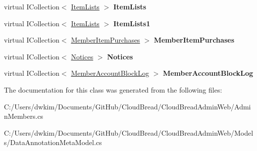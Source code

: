 \begin{DoxyCompactItemize}
\item 
virtual I\+Collection$<$ \hyperlink{class_cloud_bread_admin_web_1_1_item_lists}{Item\+Lists} $>$ {\bfseries Item\+Lists}\hypertarget{class_cloud_bread_admin_web_1_1_admin_members_a381363569bddc3b70eb317ced069f2b6}{}\label{class_cloud_bread_admin_web_1_1_admin_members_a381363569bddc3b70eb317ced069f2b6}

\item 
virtual I\+Collection$<$ \hyperlink{class_cloud_bread_admin_web_1_1_item_lists}{Item\+Lists} $>$ {\bfseries Item\+Lists1}\hypertarget{class_cloud_bread_admin_web_1_1_admin_members_ab9966913bf9066af36854b89bb31559f}{}\label{class_cloud_bread_admin_web_1_1_admin_members_ab9966913bf9066af36854b89bb31559f}

\item 
virtual I\+Collection$<$ \hyperlink{class_cloud_bread_admin_web_1_1_member_item_purchases}{Member\+Item\+Purchases} $>$ {\bfseries Member\+Item\+Purchases}\hypertarget{class_cloud_bread_admin_web_1_1_admin_members_a20dd33b5b3af8ddb5ace97df907e731d}{}\label{class_cloud_bread_admin_web_1_1_admin_members_a20dd33b5b3af8ddb5ace97df907e731d}

\item 
virtual I\+Collection$<$ \hyperlink{class_cloud_bread_admin_web_1_1_notices}{Notices} $>$ {\bfseries Notices}\hypertarget{class_cloud_bread_admin_web_1_1_admin_members_a8dee785902766e4727902f0fb2fb3729}{}\label{class_cloud_bread_admin_web_1_1_admin_members_a8dee785902766e4727902f0fb2fb3729}

\item 
virtual I\+Collection$<$ \hyperlink{class_cloud_bread_admin_web_1_1_member_account_block_log}{Member\+Account\+Block\+Log} $>$ {\bfseries Member\+Account\+Block\+Log}\hypertarget{class_cloud_bread_admin_web_1_1_admin_members_affafc7960d9c84199034ce1518ea3a76}{}\label{class_cloud_bread_admin_web_1_1_admin_members_affafc7960d9c84199034ce1518ea3a76}

\end{DoxyCompactItemize}


The documentation for this class was generated from the following files\+:\begin{DoxyCompactItemize}
\item 
C\+:/\+Users/dwkim/\+Documents/\+Git\+Hub/\+Cloud\+Bread/\+Cloud\+Bread\+Admin\+Web/Admin\+Members.\+cs\item 
C\+:/\+Users/dwkim/\+Documents/\+Git\+Hub/\+Cloud\+Bread/\+Cloud\+Bread\+Admin\+Web/\+Models/Data\+Annotation\+Meta\+Model.\+cs\end{DoxyCompactItemize}
